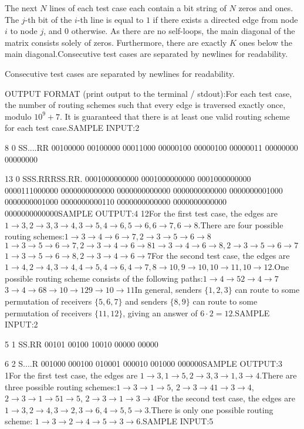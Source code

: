 \documentclass[12pt]{article}
\begin{document}
The next $N$ lines of each test case each contain a bit string of $N$ zeros and
ones. The $j$-th bit of the $i$-th line is equal to $1$ if there exists a
directed edge from node $i$  to node $j$, and $0$ otherwise. As there are no
self-loops, the main diagonal of the matrix consists solely of zeros.
Furthermore, there are exactly $K$ ones below the main diagonal.Consecutive test cases are separated by newlines for readability.

Consecutive test cases are separated by newlines for readability.

OUTPUT FORMAT (print output to the terminal / stdout):For each test case, the number of routing schemes such that every edge is
traversed exactly once, modulo $10^9+7$. It is guaranteed that there is at least
one valid routing scheme for each test case.SAMPLE INPUT:2

8 0
SS....RR
00100000
00100000
00011000
00000100
00000100
00000011
00000000
00000000

13 0
SSS.RRRSS.RR.
0001000000000
0001000000000
0001000000000
0000111000000
0000000000000
0000000000000
0000000000000
0000000001000
0000000001000
0000000000110
0000000000000
0000000000000
0000000000000SAMPLE OUTPUT:4
12For the first test case, the edges are
$1\to 3, 2\to 3, 3\to 4, 3\to 5, 4\to 6, 5\to 6, 6\to 7, 6\to 8$.There are four possible routing schemes:$1\to 3\to 4\to 6\to 7, 2\to 3\to 5\to 6\to 8$$1\to 3\to 5\to 6\to 7, 2\to 3\to 4\to 6\to 8$$1\to 3\to 4\to 6\to 8, 2\to 3\to 5\to 6\to 7$$1\to 3\to 5\to 6\to 8, 2\to 3\to 4\to 6\to 7$For the second test case, the edges are
$1\to 4, 2\to 4, 3\to 4, 4\to 5,4\to 6,4\to 7, 8\to 10, 9\to 10, 10\to 11, 10\to 12$.One possible routing scheme consists of the following paths:$1\to 4\to 5$$2\to 4\to 7$$3\to 4\to 6$$8\to 10\to 12$$9\to 10\to 11$In general, senders $\{1,2,3\}$ can route to some permutation of receivers
$\{5,6,7\}$ and senders $\{8,9\}$ can route to some permutation of receivers
$\{11,12\}$, giving an answer of $6\cdot 2=12$.SAMPLE INPUT:2

5 1
SS.RR
00101
00100
10010
00000
00000

6 2
S....R
001000
000100
010001
000010
001000
000000SAMPLE OUTPUT:3
1For the first test case, the edges are $1\to 3, 1\to 5, 2\to 3, 3\to 1, 3\to 4$.There are three possible routing schemes:$1\to 3\to 1\to 5$, $2\to 3\to 4$$1\to 3\to 4$,
$2\to 3\to 1\to 5$$1\to 5$, $2\to 3\to 1\to 3\to 4$For the second test case, the edges are
$1\to 3, 2\to 4, 3\to 2,3\to 6, 4\to 5, 5\to 3$.There is only one possible routing scheme:
$1\to 3\to 2\to 4\to 5\to 3\to 6$.SAMPLE INPUT:5
\end{document}
